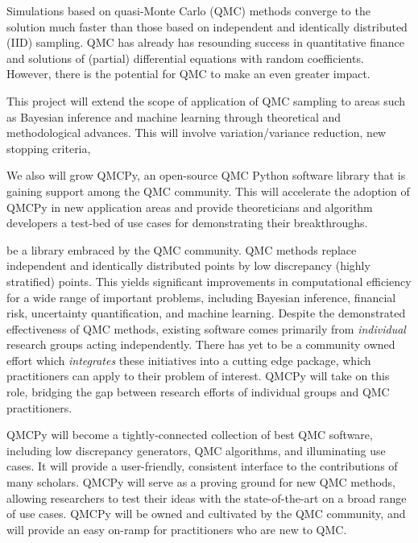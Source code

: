\documentclass[11pt]{article}%
\begin{document}

\noindent Simulations based on quasi-Monte Carlo (QMC) methods converge to the solution much faster than those based on independent and identically distributed (IID) sampling.  QMC has already has resounding success in quantitative finance and solutions of (partial) differential equations with random coefficients.  However, there is the potential for QMC to make an even greater impact.

This project will extend the scope of application of QMC sampling to areas such as Bayesian inference and machine learning through theoretical and methodological advances.  This will involve variation/variance reduction, new stopping criteria, 

We also will grow  QMCPy, an open-source QMC Python software library that is gaining support among the QMC community.  This will accelerate the adoption of QMCPy in new application areas and provide theoreticians and algorithm developers a test-bed of use cases for demonstrating their breakthroughs.


be a library embraced by the QMC community. QMC methods replace independent and identically distributed points by low discrepancy (highly stratified) points.  This yields significant improvements in computational efficiency for a wide range of important problems, including Bayesian inference, financial risk, uncertainty quantification, and machine learning. Despite the demonstrated effectiveness of QMC methods, existing software comes primarily from \textit{individual} research groups acting independently. There has yet to be a community owned effort which \textit{integrates} these initiatives into a cutting edge package, which practitioners can apply to their problem of interest. QMCPy will take on this role, bridging the gap between research efforts of individual groups and QMC practitioners.

QMCPy will become a tightly-connected collection of best QMC software, including low discrepancy generators, QMC algorithms, and illuminating use cases. It will provide a user-friendly, consistent interface to the contributions of many scholars. QMCPy will serve as a proving ground for new QMC methods, allowing researchers to test their ideas with the state-of-the-art on a broad range of use cases. QMCPy will be owned and cultivated by the QMC community, and will provide an easy on-ramp for practitioners who are new to QMC.

\bigskip
\end{document}

